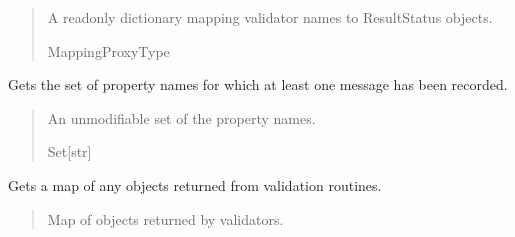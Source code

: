 \documentclass[letterpaper,10pt,english]{sphinxmanual}
\begin{document}
\begin{fulllineitems}
\begin{fulllineitems}
\begin{quote}
\begin{description}
\sphinxAtStartPar
A read\sphinxhyphen{}only dictionary mapping validator names to ResultStatus objects.

\sphinxAtStartPar
MappingProxyType

\end{description}\end{quote}

\end{fulllineitems}


\begin{fulllineitems}
\label{\detokenize{apache_commons_validator_python:apache_commons_validator_python.validator_results_new.ValidatorResults.get_property_names}}
\pysigstartsignatures
{}
\pysigstopsignatures
\sphinxAtStartPar
Gets the set of property names for which at least one message has been
recorded.
\begin{quote}\begin{description}
\sphinxAtStartPar
An unmodifiable set of the property names.

\sphinxAtStartPar
Set{[}str{]}

\end{description}\end{quote}

\end{fulllineitems}


\begin{fulllineitems}
\label{\detokenize{apache_commons_validator_python:apache_commons_validator_python.validator_results_new.ValidatorResults.get_result_value_map}}
\pysigstartsignatures
{}
\pysigstopsignatures
\sphinxAtStartPar
Gets a map of any objects returned from validation routines.
\begin{quote}\begin{description}
\sphinxAtStartPar
Map of objects returned by validators.


\end{description}
\end{quote}
\end{fulllineitems}
\end{fulllineitems}
\end{document}

